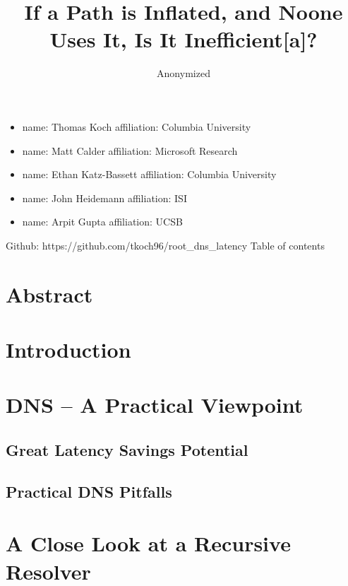 \documentclass[sigconf,letterpaper,nonacm,10pt]{acmart}
\title{If a Path is Inflated, and Noone Uses It, Is It Inefficient{[}a{]}?}
\author{
            Anonymized
        }
\date{}
\providecommand{\tightlist}{%
  \setlength{\itemsep}{0pt}\setlength{\parskip}{0pt}}
\begin{document}
\maketitle

\iffalse

\begin{itemize}
\tightlist
\item
  name: Thomas Koch affiliation: Columbia University
\item
  name: Matt Calder affiliation: Microsoft Research
\item
  name: Ethan Katz-Bassett affiliation: Columbia University
\item
  name: John Heidemann affiliation: ISI
\item
  name: Arpit Gupta affiliation: UCSB
\end{itemize}

Github: https://github.com/tkoch96/root\_dns\_latency Table of contents

\hypertarget{abstract}{%
\section*{Abstract}\label{abstract}}

\hypertarget{introduction}{%
\section{Introduction}\label{introduction}}

\hypertarget{dns-a-practical-viewpoint}{%
\section{DNS -- A Practical Viewpoint}\label{dns-a-practical-viewpoint}}

\hypertarget{great-latency-savings-potential}{%
\subsection{Great Latency Savings
Potential}\label{great-latency-savings-potential}}

\hypertarget{practical-dns-pitfalls}{%
\subsection{Practical DNS Pitfalls}\label{practical-dns-pitfalls}}

\hypertarget{a-close-look-at-a-recursive-resolver}{%
\section{A Close Look at a Recursive
Resolver}\label{a-close-look-at-a-recursive-resolver}}
\end{document}
